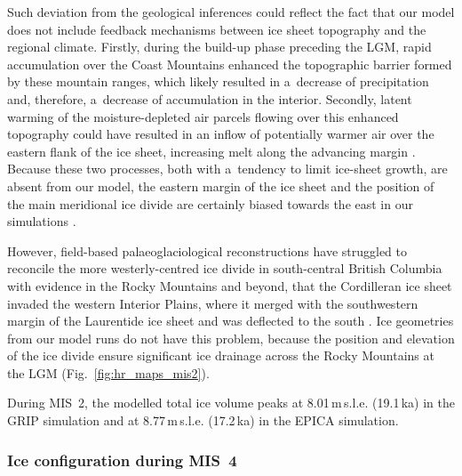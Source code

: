 \documentclass[tc, manuscript]{copernicus}
\begin{document}
      Such deviation from the geological inferences could reflect the fact
      that our model does not include feedback mechanisms between ice sheet
      topography and the regional climate. Firstly, during the build-up
      phase preceding the LGM, rapid accumulation over the Coast Mountains
      enhanced the topographic barrier formed by these mountain ranges,
      which likely resulted in a~decrease of precipitation and, therefore,
      a~decrease of accumulation in the interior. Secondly, latent warming
      of the moisture-depleted air parcels flowing over this enhanced
      topography could have resulted in an inflow of potentially warmer air
      over the eastern flank of the ice sheet, increasing melt along the
      advancing margin \citep[cf.][]{Langen.etal.2012}. Because these two
      processes, both with a~tendency to limit ice-sheet growth, are absent
      from our model, the eastern margin of the ice sheet and the position
      of the main meridional ice divide are certainly biased towards the
      east in our simulations \citep{Seguinot.etal.2014}.

      However, field-based palaeoglaciological reconstructions have
      struggled to reconcile the more westerly-centred ice divide in
      south-central British Columbia with evidence in the Rocky Mountains
      and beyond, that the Cordilleran ice sheet invaded the western
      Interior Plains, where it merged with the southwestern margin of the
      Laurentide ice sheet and was deflected to the south
      \citep{Jackson.etal.1997, Bednarski.Smith.2007, Kleman.etal.2010,
      Margold.etal.2013, Margold.etal.2013a}. Ice geometries from our model
      runs do not have this problem, because the position and elevation of
      the ice divide ensure significant ice drainage across the Rocky
      Mountains at the LGM (Fig.~\ref{fig:hr_maps_mis2}).

      During MIS~2, the modelled total ice volume peaks at
      8.01\,\unit{m}\,s.l.e. (19.1\,\unit{ka}) in the GRIP simulation and at
      8.77\,\unit{m}\,s.l.e. (17.2\,\unit{ka}) in the EPICA simulation.

\subsubsection{Ice configuration during MIS~4}
\label{sec:mis4}
\end{document}
